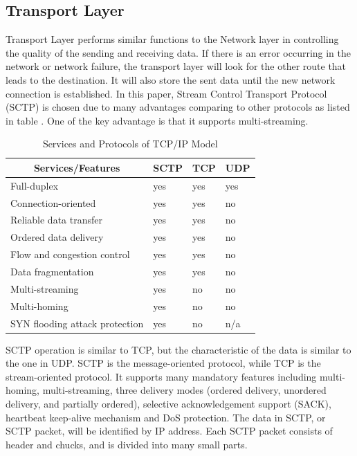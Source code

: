 \documentclass[conference]{IEEEtran}
\begin{document}
\subsection{Transport Layer}
Transport Layer performs similar functions to the Network layer in controlling the quality of the sending and receiving data. If there is an error occurring in the network or network failure, the transport layer will look for the other route that leads to the destination. It will also store the sent data until the new network connection is established. In this paper, Stream Control Transport Protocol (SCTP) is chosen due to many advantages comparing to other protocols as listed in table . One of the key advantage is that it supports multi-streaming. 

\begin{table}[h]
  \renewcommand{\arraystretch}{2}
  \renewcommand{\tabcolsep}{2mm}
  \centering
  \begin{tabularx}{0.5\textwidth}{|p{4.4cm}|p{1cm}|p{1cm}|p{1cm}|}
    \hline
    \multicolumn{1}{|c|}{\textbf{Services/Features}} &  
    \multicolumn{1}{c|}{\textbf{SCTP}} &
    \multicolumn{1}{c|}{\textbf{TCP}} &
    \multicolumn{1}{c|}{\textbf{UDP}} \\ \hline
    Full-duplex &  yes & yes & yes \\ \hline 
    Connection-oriented & yes & yes & no \\ \hline 
    Reliable data transfer & yes & yes & no \\ \hline 
    Ordered data delivery & yes & yes & no \\ \hline 
    Flow and congestion control & yes & yes & no \\ \hline
    Data fragmentation & yes & yes & no \\ \hline
    Multi-streaming & yes & no & no \\ \hline
    Multi-homing & yes & no & no \\ \hline
    SYN flooding attack protection & yes & no & n/a  \\ \hline
  \end{tabularx}
  \space
  \caption{Services and Protocols of TCP/IP Model}
  \label{tab:1}
\end{table}

SCTP operation is similar to TCP, but the characteristic of the data is similar to the one in UDP. SCTP is the message-oriented protocol, while TCP is the stream-oriented protocol. It supports many mandatory features including multi-homing, multi-streaming, three delivery modes (ordered delivery, unordered delivery, and partially ordered), selective acknowledgement support (SACK), heartbeat keep-alive mechanism and DoS protection. The data in SCTP, or SCTP packet, will be identified by IP address. Each SCTP packet consists of header and chucks, and is divided into many small parts. 
\end{document}
